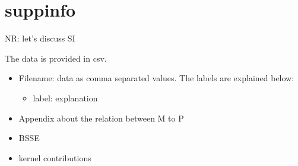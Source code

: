 \documentclass[amsmath,amssymb,preprint,aip,jcp]{revtex4-1}
\newcommand{\nr}[1]{\color{red}#1\color{black}}
\begin{document}
\section*{suppinfo}
\nr{ NR: let's discuss SI

The data is provided in csv.
\begin{itemize}
  \item Filename: data as comma separated values. The labels are explained below:
  \begin{itemize}
   \item label: explanation
  \end{itemize}
  \item Appendix about the relation between M to P
  \item BSSE
  \item kernel contributions
\end{itemize}
}



\end{document}
